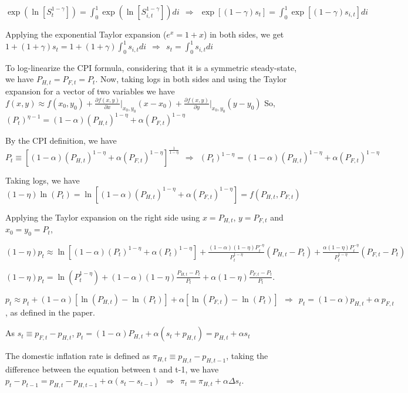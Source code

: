 \documentclass[
]{article}
\begin{document}
\(\displaystyle \exp \left(\ln \left[ S_t^{1-\gamma}\right] \right) = \int_0^1 \exp \left(\ln \left[ S_{i,t}^{1-\gamma}\right] \right)di \ \ \Rightarrow \ \ \exp[(1-\gamma)s_t]=\int_0^1 \exp[(1-\gamma)s_{i,t}]di\)

Applying the exponential Taylor expansion (\(e^x = 1 + x\)) in both
sides, we get
\(\displaystyle 1+(1+\gamma)s_t = 1 + (1+\gamma) \int_0^1 s_{i,t}di \ \ \Rightarrow \ \ s_t = \int_0^1 s_{i,t}di\)

To log-linearize the CPI formula, considering that it is a symmetric
steady-state, we have \(P_{H,t}=P_{F,t}=P_t\). Now, taking logs in both
sides and using the Taylor expansion for a vector of two variables we
have
\(\displaystyle f(x,y) \approx f(x_0,y_0)+\frac{\partial f(x,y)}{\partial x} \biggr|_{x_0,y_0}(x-x_0)+\frac{\partial f(x,y)}{\partial y} \biggr|_{x_0,y_0}(y-y_0)\)
So,
\(\displaystyle (P_t)^{\eta-1} = (1-\alpha)(P_{H,t})^{1-\eta} + \alpha(P_{F,t})^{1-\eta}\)

By the CPI definition, we have
\(\displaystyle P_t \equiv \left[ (1-\alpha)(P_{H,t})^{1-\eta} + \alpha(P_{F,t})^{1-\eta} \right]^{\frac{1}{1-\eta}} \ \ \Rightarrow \ \ (P_t)^{1-\eta} = (1-\alpha)(P_{H,t})^{1-\eta} + \alpha(P_{F,t})^{1-\eta}\)

Taking logs, we have
\((1-\eta)\ln(P_t) = \ln\left[ (1-\alpha)(P_{H,t})^{1-\eta} + \alpha(P_{F,t})^{1-\eta} \right]=f(P_{H,t},P_{F,t})\)

Applying the Taylor expansion on the right side using \(x = P_{H,t}\),
\(y = P_{F,t}\) and \(x_0 = y_0 = P_t\),

\(\displaystyle (1-\eta)p_t \approx \ln \left[ (1-\alpha)(P_t)^{1-\eta} + \alpha(P_t)^{1-\eta} \right]+ \frac{(1-\alpha)(1-\eta)P_t^{-\eta}}{P_t^{1-\eta}}(P_{H,t}-P_t) + \frac{\alpha(1-\eta)P_t^{-\eta}}{P_t^{1-\eta}}(P_{F,t}-P_t)\)

\(\displaystyle (1-\eta)p_t = \ln(P_t^{1-\eta}) + (1-\alpha)(1-\eta)\frac{P_{H,t}-P_t}{P_t} + \alpha(1-\eta)\frac{P_{F,t}-P_t}{P_t}\).

\(p_t \approx p_t + (1-\alpha)[\ln(P_{H,t})-\ln(P_t)] + \alpha[\ln(P_{F,t})-\ln(P_t)] \ \ \Rightarrow \ \  p_t = (1-\alpha)p_{H,t}+\alpha \ p_{F,t}\),
as defined in the paper.

As \(s_t \equiv p_{F,t}-p_{H,t}\),
\(p_t=(1-\alpha)P_{H,t}+\alpha (s_t+p_{H,t}) = p_{H,t} + \alpha s_t\)

The domestic inflation rate is defined as
\(\displaystyle \pi_{H,t} \equiv p_{H,t}-p_{H,t-1}\), taking the
difference between the equation between t and t-1, we have
\(p_t-p_{t-1}=p_{H,t}-p_{H,t-1}+\alpha(s_t-s_{t-1}) \ \ \Rightarrow \ \ \pi_t = \pi_{H,t}+\alpha \Delta s_t\).
\end{document}
